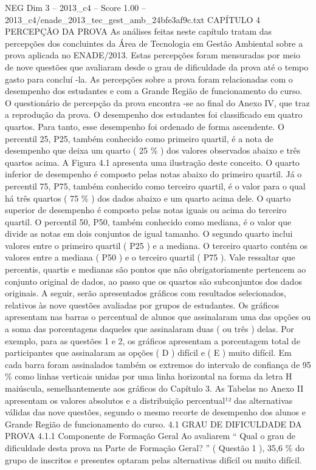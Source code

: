 \begin{textsample}{NEG Dim 3 – 2013\_c4 – Score 1.00 – 2013\_c4/enade\_2013\_tec\_gest\_amb\_24bfe3af9c.txt}  \label{ex:f3_neg_142}
CAPÍTULO 4 PERCEPÇÃO DA PROVA As análises feitas neste capítulo tratam das percepções dos concluintes da Área de Tecnologia em Gestão Ambiental sobre a prova aplicada no ENADE/2013.
Estas percepções foram mensuradas por meio de nove questões que avaliaram desde o grau de dificuldade da prova até o tempo gasto para concluí -la.
As percepções sobre a prova foram relacionadas com o desempenho dos estudantes e com a Grande Região de funcionamento do curso.
O questionário de percepção da prova encontra -se ao final do Anexo IV, que traz a reprodução da prova.
O desempenho dos estudantes foi classificado em quatro quartos.
Para tanto, esse desempenho foi ordenado de forma ascendente.
O percentil 25, P25, também conhecido como primeiro quartil, é a nota de desempenho que deixa um quarto ( 25 \% ) dos valores observados abaixo e três quartos acima.
A Figura 4.1 apresenta uma ilustração deste conceito.
O quarto inferior de desempenho é composto pelas notas abaixo do primeiro quartil.
Já o percentil 75, P75, também conhecido como terceiro quartil, é o valor para o qual há três quartos ( 75 \% ) dos dados abaixo e um quarto acima dele.
O quarto superior de desempenho é composto pelas notas iguais ou acima do terceiro quartil.
O percentil 50, P50, também conhecido como mediana, é o valor que divide as notas em dois conjuntos de igual tamanho.
O segundo quarto inclui valores entre o primeiro quartil ( P25 ) e a mediana.
O terceiro quarto contém os valores entre a mediana ( P50 ) e o terceiro quartil ( P75 ).
Vale ressaltar que percentis, quartis e medianas são pontos que não obrigatoriamente pertencem ao conjunto original de dados, ao passo que os quartos são subconjuntos dos dados originais.
A seguir, serão apresentados gráficos com resultados selecionados, relativos às nove questões avaliadas por grupos de estudantes.
Os gráficos apresentam nas barras o percentual de alunos que assinalaram uma das opções ou a soma das porcentagens daqueles que assinalaram duas ( ou três ) delas.
Por exemplo, para as questões 1 e 2, os gráficos apresentam a porcentagem total de participantes que assinalaram as opções ( D ) difícil e ( E ) muito difícil.
Em cada barra foram assinalados também os extremos do intervalo de confiança de 95 \% como linhas verticais unidas por uma linha horizontal na forma da letra H maiúscula, semelhantemente aos gráficos do Capítulo 3.
As Tabelas no Anexo II apresentam os valores absolutos e a distribuição percentual¹² das alternativas válidas das nove questões, segundo o mesmo recorte de desempenho dos alunos e Grande Região de funcionamento do curso. 4.1 GRAU DE DIFICULDADE DA PROVA 4.1.1 Componente de Formação Geral Ao avaliarem “ Qual o grau de dificuldade desta prova na Parte de Formação Geral? ” ( Questão 1 ), 35,6 \% do grupo de inscritos e presentes optaram pelas alternativas difícil ou muito difícil.

\end{textsample}
